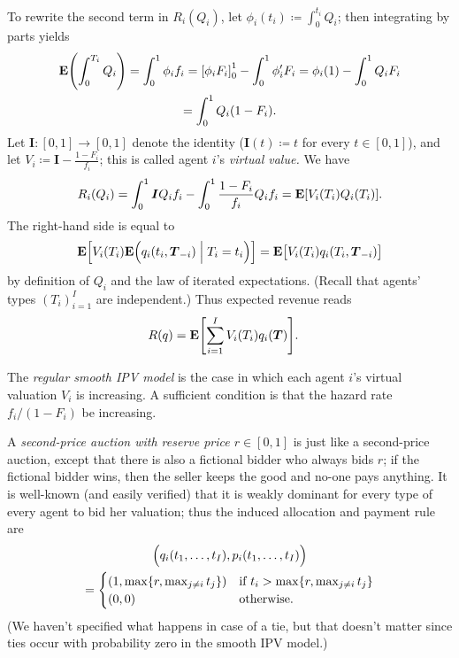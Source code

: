 To rewrite the second term in $R_i(Q_i)$,
let $\phi_i(t_i) \coloneqq \int_0^{t_i} Q_i$;
then integrating by parts yields
%
\begin{multline*}
	\E\left( \int_0^{T_i} Q_i \right)
	= \int_0^1 \phi_i f_i
	= \left[ \phi_i F_i \right]_0^1
	- \int_0^1 \phi_i' F_i
	= \phi_i(1)
	- \int_0^1 Q_i F_i
	\\
	= \int_0^1 Q_i (1-F_i) .
\end{multline*}
%
Let $\boldsymbol{I} : [0,1] \to [0,1]$ denote the identity ($\boldsymbol{I}(t) \coloneqq t$ for every $t \in [0,1]$),
and let $V_i \coloneqq \boldsymbol{I} - \frac{1-F_i}{f_i}$;
this is called agent $i$'s \emph{virtual value.}
We have
%
\begin{equation*}
	R_i(Q_i)
	= \int_0^1 \boldsymbol{I} Q_i f_i
	- \int_0^1 \frac{1-F_i}{f_i} Q_i f_i 
	= \E\left[ V_i(T_i) Q_i(T_i) \right] .
\end{equation*}
%
The right-hand side is equal to
%
\begin{equation*}
	\mathbf{E}\Bigl[ V_i(T_i)
	\mathbf{E}\Bigl( q_i(t_i,\boldsymbol{T}_{-i})
	\Bigm| T_i=t_i \Bigr)
	\Bigr]
	= \mathbf{E}\bigl[ V_i(T_i) q_i(T_i,\boldsymbol{T}_{-i}) \bigr] 
\end{equation*}
%
by definition of $Q_i$ and the law of iterated expectations.
(Recall that agents' types $(T_i)_{i=1}^I$ are independent.)
Thus expected revenue reads
%
\begin{align*}
	R(q)
	&= \E\left[ \sum_{i=1}^I V_i(T_i) q_i(\boldsymbol{T}) \right] .
\end{align*}

The \emph{regular smooth IPV model} is the case in which each agent $i$'s virtual valuation $V_i$ is increasing. A sufficient condition is that the hazard rate $f_i / (1-F_i)$ be increasing.

A \emph{second-price auction with reserve price $r \in [0,1]$}
is just like a second-price auction,
except that there is also a fictional bidder who always bids $r$;
if the fictional bidder wins, then the seller keeps the good and no-one pays anything.
It is well-known (and easily verified) that it is weakly dominant for every type of every agent to bid her valuation;
thus the induced allocation and payment rule are
%
\begin{multline*}
	\Bigl( q_i(t_1,\dots,t_I), p_i(t_1,\dots,t_I) \Bigr)
	\\
	= 
	\begin{cases}
		\left( 1, \max\left\{ r, \max_{j \neq i} t_j \right\} \right)
		& \text{if $t_i > \max\left\{ r, \max_{j \neq i} t_j \right\}$}
		\\
		\left( 0, 0 \right)
		& \text{otherwise.}
	\end{cases}
\end{multline*}
%
(We haven't specified what happens in case of a tie, but that doesn't matter since ties occur with probability zero in the smooth IPV model.)



